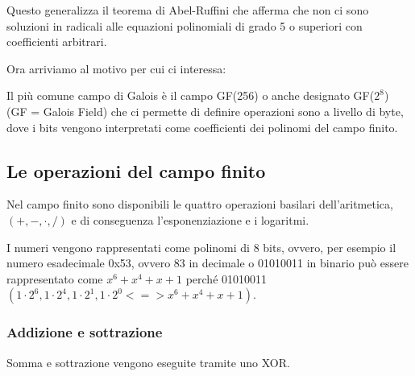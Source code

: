  

\textsf{\small Questo generalizza il teorema di Abel-Ruffini che afferma che non ci sono soluzioni in radicali alle equazioni polinomiali di grado 5 o superiori con coefficienti arbitrari.} %

\textsf{\small Ora arriviamo al motivo per cui ci interessa:} %

  

\textsf{\small Il più comune campo di Galois è il campo GF(256) o anche designato GF($2^8$) (GF = Galois Field) che ci permette di definire operazioni sono a livello di byte, dove i bits vengono interpretati come coefficienti dei polinomi del campo finito.}

\subsection{Le operazioni del campo finito}

 

\textsf{\small Nel campo finito sono disponibili le quattro operazioni basilari dell'aritmetica, $(+, -, \cdot, /)$ e di conseguenza l'esponenziazione e i logaritmi.} %

\textsf{\small I numeri vengono rappresentati come polinomi di 8 bits, ovvero, per esempio il numero esadecimale 0x53, ovvero 83 in decimale o 01010011 in binario può essere rappresentato come $x^6 + x^4 + x + 1$ perché 01010011 $(1 \cdot 2^6, 1 \cdot 2^4, 1 \cdot 2^1, 1 \cdot 2^0 <=> x^6 + x^4 + x + 1)$. }


\subsubsection{Addizione e sottrazione}

  

\textsf{\small Somma e sottrazione vengono eseguite tramite uno XOR.}

